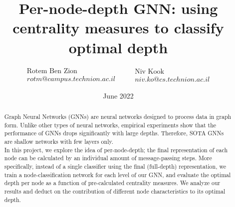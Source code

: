\documentclass[11pt,a4paper]{article}
\title{Per-node-depth GNN: using centrality measures to classify optimal depth}
\author{$ \begin{matrix} \text{Rotem Ben Zion} \\ rotm@campus.technion.ac.il \end{matrix} \qquad \begin{matrix} \text{Niv Kook} \\ niv.ko@cs.technion.ac.il \end{matrix}$\\}
\date{June 2022}
\begin{document}
	
\maketitle
\begin{abstract}
Graph Neural Networks (GNNs) are neural networks designed to process data in graph form. Unlike other types of neural networks, empirical experiments show that the performance of GNNs drops significantly with large depths. Therefore, SOTA GNNs are shallow networks with few layers only.\\
In this project, we explore the idea of per-node-depth; the final representation of each node can be calculated by an individual amount of message-passing steps. More specifically, instead of a single classifier using the final (full-depth) representation, we train a node-classification network for each level of our GNN, and evaluate the optimal depth per node as a function of pre-calculated centrality measures. We analyze our results and deduct on the contribution of different node characteristics to its optimal depth.
\end{abstract}
\end{document}

